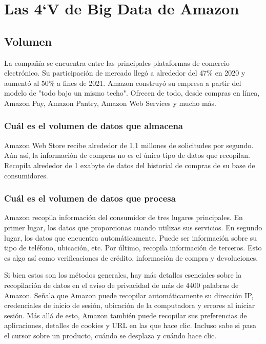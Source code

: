 \clearpage
\section{Las 4`V de Big Data de Amazon }
\subsection{Volumen}
La compañía se encuentra entre las principales plataformas de comercio electrónico. Su participación de mercado llegó a alrededor del 47$\%$ en 2020 y aumentó al 50$\%$ a fines de 2021. Amazon construyó su empresa a partir del modelo de "todo bajo un mismo techo". Ofrecen de todo, desde compras en línea, Amazon Pay, Amazon Pantry, Amazon Web Services y mucho más.


\subsubsection{Cuál es el volumen de datos que almacena} 
Amazon Web Store recibe alrededor de 1,1 millones de solicitudes por segundo. Aún así, la información de compras no es el único tipo de datos que recopilan. Recopila alrededor de 1 exabyte de datos del historial de compras de su base de consumidores.

\subsubsection{Cuál es el volumen de datos que procesa}
Amazon recopila información del consumidor de tres lugares principales. En primer lugar, los datos que proporcionas cuando utilizas sus servicios. En segundo lugar, los datos que encuentra automáticamente. Puede ser información sobre su tipo de teléfono, ubicación, etc. Por último, recopila información de terceros. Esto es algo así como verificaciones de crédito, información de compra y devoluciones.

Si bien estos son los métodos generales, hay más detalles esenciales sobre la recopilación de datos en el aviso de privacidad de más de 4400 palabras de Amazon. Señala que Amazon puede recopilar automáticamente su dirección IP, credenciales de inicio de sesión, ubicación de la computadora y errores al iniciar sesión. Más allá de esto, Amazon también puede recopilar sus preferencias de aplicaciones, detalles de cookies y URL en las que hace clic. Incluso sabe si pasa el cursor sobre un producto, cuándo se desplaza y cuándo hace clic.

